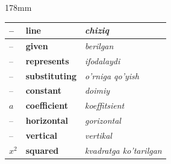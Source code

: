 \documentclass[a4paper]{article}
\begin{document}
\begin{textblock*}{178mm}
{\begin{tabular}{|>{\centering\arraybackslash}p{22mm}|p{68mm}|p{72mm}|}
-- & \textbf{line} & \textit{chiziq} \\ \hline
\rowcolor{badge!18}
-- & \textbf{given} & \textit{berilgan} \\ \hline
-- & \textbf{represents} & \textit{ifodalaydi} \\ \hline
\rowcolor{badge!18}
-- & \textbf{substituting} & \textit{o'rniga qo'yish} \\ \hline
-- & \textbf{constant} & \textit{doimiy} \\ \hline
\rowcolor{badge!18}
$a$ & \textbf{coefficient} & \textit{koeffitsient} \\ \hline
-- & \textbf{horizontal} & \textit{gorizontal} \\ \hline
\rowcolor{badge!18}
-- & \textbf{vertical} & \textit{vertikal} \\ \hline
$x^2$ & \textbf{squared} & \textit{kvadratga ko'tarilgan} \\ \hline
\end{tabular}
}
\end{textblock*}
\end{document}
